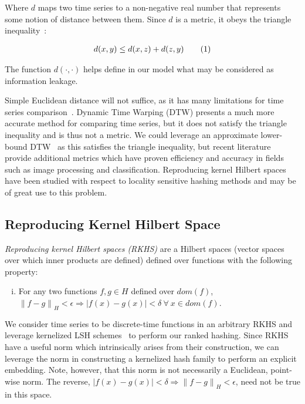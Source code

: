\documentclass[a4paper]{article}
\newcommand\numberthis{\addtocounter{equation}{1}\tag{\theequation}}
\newcommand{\norm}[1]{\left\lVert#1\right\rVert}
\begin{document}
Where $d$ maps two time series to a non-negative real number that represents some notion of distance between them.
Since $d$ is a metric, it obeys the triangle inequality~\cite{rosenlicht68-realanalysis}:

\begin{align*}
    d(x,y) \le d(x,z) + d(z,y) \numberthis
\end{align*}


The function $d(\cdot,\cdot)$ helps define in our model what may be considered as information leakage.



Simple Euclidean distance will not suffice, as it has many limitations for time series comparison~\cite{weighted-dtw}.
Dynamic Time Warping (DTW) presents a much more accurate method for comparing time series, but it does not satisfy the triangle inequality and is thus not a metric.
We could leverage an approximate lower-bound DTW~\cite{Lemire09-DTW} as this satisfies the triangle inequality, but recent literature~\cite{Kulis12-KLSH,Jiang15-KLSH,Kim16-SLSH} provide additional metrics which have proven efficiency and accuracy in fields such as image processing and classification.
Reproducing kernel Hilbert spaces have been studied with respect to locality sensitive hashing methods and may be of great use to this problem.

\subsection{Reproducing Kernel Hilbert Space}

\textit{Reproducing kernel Hilbert spaces (RKHS)} are a Hilbert spaces (vector spaces over which inner products are defined) defined over functions with the following property:
\begin{enumerate}[(i)]
    \item For any two functions $f,g \in H$ defined over $dom(f)$, $\norm{f-g}_{H} < \epsilon \Rightarrow |f(x)-g(x)| < \delta~\forall~x \in dom(f)$. 
\end{enumerate}

We consider time series to be discrete-time functions in an arbitrary RKHS and leverage kernelized LSH schemes~\cite{Kale14-KLSH,Jiang15-KLSH, Kulis12-KLSH} to perform our ranked hashing.
Since RKHS have a useful norm which intrinsically arises from their construction, we can leverage the norm in constructing a kernelized hash family to perform an explicit embedding.
Note, however, that this norm is not necessarily a Euclidean, point-wise norm.
The reverse, $|f(x)-g(x)| < \delta \Rightarrow \norm{f-g}_{H} < \epsilon$, need not be true in this space.
\end{document}
